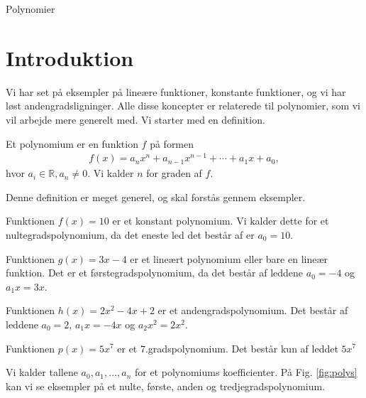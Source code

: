 \begin{center}
\Huge
Polynomier
\end{center}
\section*{Introduktion}

Vi har set på eksempler på lineære funktioner, konstante funktioner, og vi har løst andengradsligninger. Alle disse koncepter er relaterede til polynomier, som vi vil arbejde mere generelt med. Vi starter med en definition.
\begin{defn}
Et polynomium er en funktion $f$ på formen
\begin{align*}
f(x) = a_nx^n+a_{n-1}x^{n-1}+\cdots+a_1 x + a_0,
\end{align*}
hvor $a_i \in \mathbb{R}, a_n \neq 0$. Vi kalder $n$ for graden af $f$. 
\end{defn}
Denne definition er meget generel, og skal forstås gennem eksempler. 
\begin{exa}
Funktionen $f(x) = 10$ er et konstant polynomium. Vi kalder dette for et nultegradspolynomium, da det eneste led det består af er $a_0=10$. 
\end{exa}
\begin{exa}
Funktionen $g(x) = 3x-4$  er et lineært polynomium eller bare en lineær funktion. Det er et førstegradspolynomium, da det består af leddene $a_0 = -4$ og $a_1x = 3x$. 
\end{exa}
\begin{exa}
Funktionen $h(x) = 2x^2-4x+2$ er et andengradspolynomium. Det består af leddene $a_0 = 2$, $a_1x = -4x$ og $a_2x^2 = 2x^2$.
\end{exa}
\begin{exa}
Funktionen $p(x) = 5x^7$ er et 7.gradspolynomium. Det består kun af leddet $5x^7$
\end{exa}
Vi kalder tallene $a_0,a_1,\hdots,a_n$ for et polynomiums koefficienter. På Fig. \ref{fig:polys} kan vi se eksempler på et nulte, første, anden og tredjegradspolynomium.

